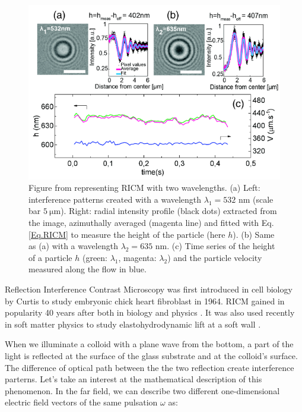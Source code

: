 \begin{figure}[h]
	\centering
	\includegraphics[scale=0.8]{02_body/chapter2/images/RICM.png}
	\caption{Figure from \cite{davies_elastohydrodynamic_2018} representing \gls{RICM} with two wavelengths. (a) Left: interference patterns created with a wavelength $\lambda_1 = 532$ nm (scale bar $ 5~\mathrm{\mu m}$). 
		Right: radial intensity profile (black dots) extracted from the image, azimuthally averaged (magenta line) and fitted with Eq.\ref{Eq.RICM} to measure the height of the particle (here $h$). (b) Same as (a) with a wavelength $\lambda_2 = 635$ nm. (c) Time series of the height of a particle $h$ (green: $ \lambda_1$, magenta: $\lambda_2$) and the particle velocity measured along the flow in blue. }
	\label{fig.RICM}
\end{figure}


Reflection Interference Contrast Microscopy was first introduced in cell biology by Curtis to study embryonic chick heart fibroblast \cite{curtis_mechanism_1964} in 1964. \gls{RICM} gained in popularity 40 years after both in biology and physics \cite{filler_reflection_2000, siver_use_2000, weber_2_2003, limozin_quantitative_2009, nadal_probing_2002, raedler_measurement_1992}. It was also used recently in soft matter physics to study elastohydrodynamic lift at a soft wall \cite{davies_elastohydrodynamic_2018}.

When we illuminate a colloid with a plane wave from the bottom, a part of the light is reflected at the surface of the glass substrate and at the colloid's surface. The difference of optical path between the the two reflection create interference parterns. Let's take an interest at the mathematical description of this phenomenon. In the far field, we can describe two different one-dimensional electric field vectors of the same pulsation $\omega$ \cite{f_bohren_absorption_1998} as:

